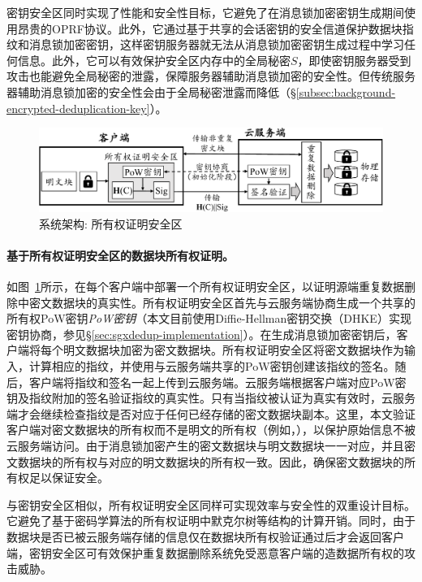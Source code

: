 密钥安全区同时实现了性能和安全性目标，它避免了在消息锁加密密钥生成期间使用昂贵的OPRF协议\cite{bellare2013DupLESS}。此外，它通过基于共享的会话密钥的安全信道保护数据块指纹和消息锁加密密钥，这样密钥服务器就无法从消息锁加密密钥生成过程中学习任何信息。此外，它可以有效保护安全区内存中的全局秘密$S$，即使密钥服务器受到攻击也能避免全局秘密的泄露，保障服务器辅助消息锁加密的安全性。但传统服务器辅助消息锁加密的安全性会由于全局秘密泄露而降低（\S\ref{subsec:background-encrypted-deduplication-key}）。

\begin{figure}[!htb]
  \centering
  \includegraphics[width=\textwidth]{pic/sgxdedup/pow.pdf}
  \caption{\sysnameS 系统架构: 所有权证明安全区}
  \label{fig:sgxdedup-overview-pow}
\end{figure}

\paragraph*{基于所有权证明安全区的数据块所有权证明。}如图~\ref{fig:sgxdedup-overview-pow}所示，\sysnameS 在每个客户端中部署一个所有权证明安全区，以证明源端重复数据删除中密文数据块的真实性。所有权证明安全区首先与云服务端协商生成一个共享的所有权PoW密钥\textit{PoW密钥}（本文目前使用Diffie-Hellman密钥交换（DHKE）实现密钥协商，参见\S\ref{sec:sgxdedup-implementation}）。在生成消息锁加密密钥后，客户端将每个明文数据块加密为密文数据块。所有权证明安全区将密文数据块作为输入，计算相应的指纹，并使用与云服务端共享的PoW密钥创建该指纹的签名。随后，客户端将指纹和签名一起上传到云服务端。云服务端根据客户端对应PoW密钥及指纹附加的签名验证指纹的真实性。只有当指纹被认证为真实有效时，云服务端才会继续检查指纹是否对应于任何已经存储的密文数据块副本。这里，本文验证客户端对密文数据块的所有权而不是明文的所有权（例如，\cite{halevi11}），以保护原始信息不被云服务端访问。由于消息锁加密产生的密文数据块与明文数据块一一对应，并且密文数据块的所有权与对应的明文数据块的所有权一致。因此，确保密文数据块的所有权足以保证安全。

与密钥安全区相似，所有权证明安全区同样可实现效率与安全性的双重设计目标。它避免了基于密码学算法的所有权证明中默克尔树等结构的计算开销。同时，由于数据块是否已被云服务端存储的信息仅在数据块所有权验证通过后才会返回客户端，密钥安全区可有效保护重复数据删除系统免受恶意客户端的造数据所有权的攻击威胁。

